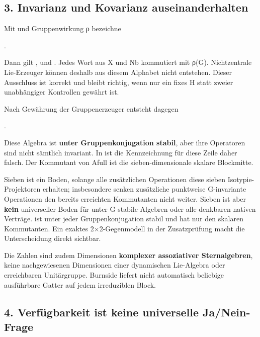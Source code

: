 \subsection{3. Invarianz und Kovarianz
auseinanderhalten}\label{invarianz-und-kovarianz-auseinanderhalten}

Mit  und Gruppenwirkung ρ bezeichne

.

Dann gilt ,  und
. Jedes Wort aus X und Nb kommutiert mit
ρ(G). Nichtzentrale Lie-Erzeuger können deshalb aus diesem Alphabet
nicht entstehen. Dieser Ausschluss ist korrekt und bleibt richtig, wenn
nur ein fixes H statt zweier unabhängiger Kontrollen gewährt ist.

Nach Gewährung der Gruppenerzeuger entsteht dagegen

.

Diese Algebra ist \textbf{unter Gruppenkonjugation stabil}, aber ihre
Operatoren sind nicht sämtlich invariant. In
 ist die Kennzeichnung
 für diese Zeile daher falsch. Der
Kommutant von Afull ist die sieben-dimensionale skalare Blockmitte.

Sieben ist ein Boden, solange alle zusätzlichen Operationen diese sieben
Isotypie-Projektoren erhalten; insbesondere senken zusätzliche
punktweise G-invariante Operationen den bereits erreichten Kommutanten
nicht weiter. Sieben ist aber \textbf{kein} universeller Boden für unter
G stabile Algebren oder alle denkbaren nativen Verträge.
 ist unter jeder Gruppenkonjugation stabil und hat nur
den skalaren Kommutanten. Ein exaktes 2×2-Gegenmodell in der
Zusatzprüfung macht die Unterscheidung direkt sichtbar.

Die Zahlen sind zudem Dimensionen \textbf{komplexer assoziativer
Sternalgebren}, keine nachgewiesenen Dimensionen einer dynamischen
Lie-Algebra oder erreichbaren Unitärgruppe. Burnside liefert nicht
automatisch beliebige ausführbare Gatter auf jedem irreduziblen Block.

\subsection{4. Verfügbarkeit ist keine universelle
Ja/Nein-Frage}\label{verfuxfcgbarkeit-ist-keine-universelle-janein-frage}

